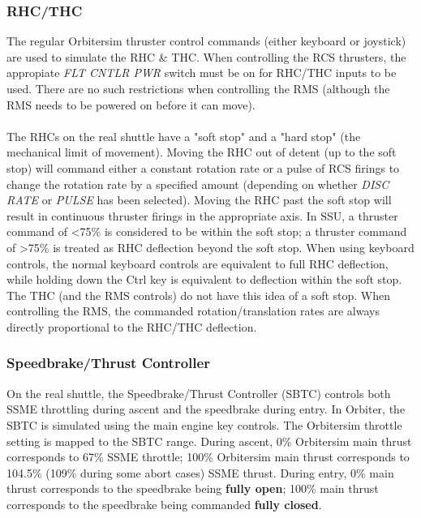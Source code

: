 \documentclass[13pt]{article}
\begin{document}
\begin{multicols}{2}
\subsubsection{\large RHC/THC}
The regular Orbitersim thruster control commands (either keyboard or joystick) are used to simulate the RHC \& THC. When controlling the RCS thrusters, the appropiate \textit{FLT CNTLR PWR} switch must be on for RHC/THC inputs to be used. There are no such restrictions when controlling the RMS (although the RMS needs to be powered on before it can move).
\\
\\
The RHCs on the real shuttle have a "soft stop" and a "hard stop" (the mechanical limit of movement). Moving the RHC out of detent (up to the soft stop) will command either a constant rotation rate or a pulse of RCS firings to change the rotation rate by a specified amount (depending on whether \textit{DISC RATE} or \textit{PULSE} has been selected). Moving the RHC past the soft stop will result in continuous thruster firings in the appropriate axis. In SSU, a thruster command of <75\% is considered to be within the soft stop; a thruster command of >75\% is treated as RHC deflection beyond the soft stop. When using keyboard controls, the normal keyboard controls are equivalent to full RHC deflection, while holding down the Ctrl key is equivalent to deflection within the soft stop. The THC (and the RMS controls) do not have this idea of a soft stop. When controlling the RMS, the commanded rotation/translation rates are always directly proportional to the RHC/THC deflection.

\subsubsection{\large Speedbrake/Thrust Controller}
On the real shuttle, the Speedbrake/Thrust Controller (SBTC) controls both SSME throttling during ascent and the speedbrake during entry. In Orbiter, the SBTC is simulated using the main engine key controls. The Orbitersim throttle setting is mapped to the SBTC range. During ascent, 0\% Orbitersim main thrust corresponds to 67\% SSME throttle; 100\% Orbitersim main thrust corresponds to 104.5\% (109\% during some abort cases) SSME thrust. During entry, 0\% main thrust corresponds to the speedbrake being \textbf{fully open}; 100\% main thrust corresponds to the speedbrake being commanded \textbf{fully closed}.


\end{multicols}
\end{document}
